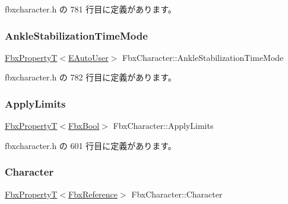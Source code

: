  fbxcharacter.\+h の 781 行目に定義があります。

\mbox{\label{class_fbx_character_a3153af9c5fe1f2cd48022ccc4cfed804}} 
\subsubsection{\texorpdfstring{Ankle\+Stabilization\+Time\+Mode}{AnkleStabilizationTimeMode}}
{\footnotesize\ttfamily \hyperlink{class_fbx_property_t}{Fbx\+PropertyT}$<$\hyperlink{class_fbx_character_a5b03462709a82a15d89ee4563a4c49df}{E\+Auto\+User}$>$ Fbx\+Character\+::\+Ankle\+Stabilization\+Time\+Mode}



 fbxcharacter.\+h の 782 行目に定義があります。

\mbox{\label{class_fbx_character_ac65d1b275b0ad4ff6f53750d87c5fb97}} 
\subsubsection{\texorpdfstring{Apply\+Limits}{ApplyLimits}}
{\footnotesize\ttfamily \hyperlink{class_fbx_property_t}{Fbx\+PropertyT}$<$\hyperlink{fbxtypes_8h_a92e0562b2fe33e76a242f498b362262e}{Fbx\+Bool}$>$ Fbx\+Character\+::\+Apply\+Limits}



 fbxcharacter.\+h の 601 行目に定義があります。

\mbox{\label{class_fbx_character_a983a4ad7a5845c73bfca3e5c3ba7c627}} 
\subsubsection{\texorpdfstring{Character}{Character}}
{\footnotesize\ttfamily \hyperlink{class_fbx_property_t}{Fbx\+PropertyT}$<$\hyperlink{fbxtypes_8h_a44df6a2eec915cf27cd481e5c5e48a24}{Fbx\+Reference}$>$ Fbx\+Character\+::\+Character}



